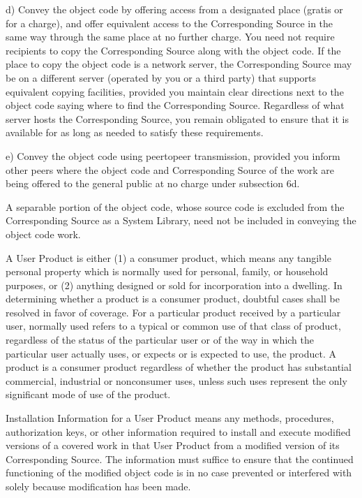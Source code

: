 \documentclass[a4paper,10pt,english]{sphinxmanual}
\begin{document}
\begin{sphinxVerbatim}[commandchars=\\\{\}]
    d) Convey the object code by offering access from a designated
    place (gratis or for a charge), and offer equivalent access to the
    Corresponding Source in the same way through the same place at no
    further charge.  You need not require recipients to copy the
    Corresponding Source along with the object code.  If the place to
    copy the object code is a network server, the Corresponding Source
    may be on a different server (operated by you or a third party)
    that supports equivalent copying facilities, provided you maintain
    clear directions next to the object code saying where to find the
    Corresponding Source.  Regardless of what server hosts the
    Corresponding Source, you remain obligated to ensure that it is
    available for as long as needed to satisfy these requirements.

    e) Convey the object code using peer\PYGZhy{}to\PYGZhy{}peer transmission, provided
    you inform other peers where the object code and Corresponding
    Source of the work are being offered to the general public at no
    charge under subsection 6d.

  A separable portion of the object code, whose source code is excluded
from the Corresponding Source as a System Library, need not be
included in conveying the object code work.

  A \PYGZdq{}User Product\PYGZdq{} is either (1) a \PYGZdq{}consumer product\PYGZdq{}, which means any
tangible personal property which is normally used for personal, family,
or household purposes, or (2) anything designed or sold for incorporation
into a dwelling.  In determining whether a product is a consumer product,
doubtful cases shall be resolved in favor of coverage.  For a particular
product received by a particular user, \PYGZdq{}normally used\PYGZdq{} refers to a
typical or common use of that class of product, regardless of the status
of the particular user or of the way in which the particular user
actually uses, or expects or is expected to use, the product.  A product
is a consumer product regardless of whether the product has substantial
commercial, industrial or non\PYGZhy{}consumer uses, unless such uses represent
the only significant mode of use of the product.

  \PYGZdq{}Installation Information\PYGZdq{} for a User Product means any methods,
procedures, authorization keys, or other information required to install
and execute modified versions of a covered work in that User Product from
a modified version of its Corresponding Source.  The information must
suffice to ensure that the continued functioning of the modified object
code is in no case prevented or interfered with solely because
modification has been made.


\end{sphinxVerbatim}
\end{document}
